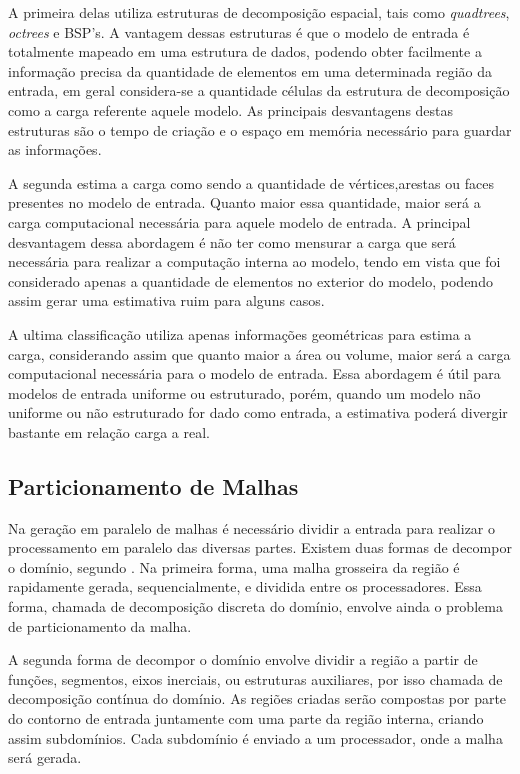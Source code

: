 A primeira delas utiliza estruturas de decomposição espacial, tais como \textit{quadtrees}, \textit{octrees} e BSP's. A vantagem dessas estruturas é que o modelo de entrada é totalmente mapeado em uma estrutura de dados, podendo obter facilmente a informação precisa da quantidade de elementos em uma determinada região da entrada, em geral considera-se a quantidade células da estrutura de decomposição como a carga referente aquele modelo. As principais desvantagens destas estruturas são o tempo de criação e o espaço em memória necessário para guardar as informações.

A segunda estima a carga como sendo a quantidade de vértices,arestas ou faces presentes no modelo de entrada. Quanto maior essa quantidade, maior será a carga computacional necessária para aquele modelo de entrada. A principal desvantagem dessa abordagem é não ter como mensurar a carga que será necessária para realizar a computação interna ao modelo, tendo em vista que foi considerado apenas a quantidade de elementos no exterior do modelo, podendo assim gerar uma estimativa ruim para alguns casos.

A ultima classificação utiliza apenas informações geométricas para estima a carga, considerando assim que quanto maior a área ou volume, maior será a carga computacional necessária para o modelo de entrada. Essa abordagem é útil para modelos de entrada uniforme ou estruturado, porém, quando um modelo não uniforme ou não estruturado for dado como entrada, a estimativa poderá divergir bastante em relação carga a real.







\subsection{Particionamento de Malhas}
 
Na geração em paralelo de malhas é necessário dividir a entrada para realizar o processamento em paralelo das diversas partes. Existem duas formas de decompor o domínio, segundo  \cite{bib:Survey_Chrisochoides05}. Na primeira forma, uma malha grosseira da região é rapidamente gerada, sequencialmente, e dividida entre os processadores. Essa forma, chamada de decomposição discreta do domínio, envolve ainda o problema de particionamento da malha. 

A segunda forma de decompor o domínio envolve dividir a região a partir de funções, segmentos, eixos inerciais, ou estruturas auxiliares, por isso chamada de decomposição contínua do domínio. As regiões criadas serão compostas por parte do contorno de entrada juntamente com uma parte da região interna, criando assim subdomínios. Cada subdomínio é enviado a um processador, onde a malha será gerada.

